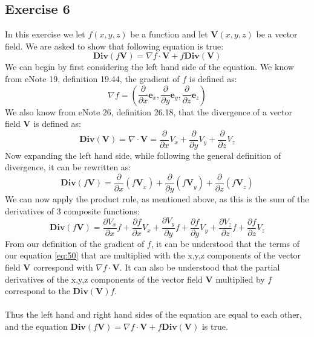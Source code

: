 \documentclass{article}
\begin{document}
\subsection{Exercise 6}
In this exercise we let $f(x,y,z)$ be a function and let $\mathbf{V}(x,y,z)$ be a vector field. We are asked to show that following equation is true:
\begin{equation}
    \mathbf{Div}(f\mathbf{V})= \nabla f\cdot \mathbf{V}+\mathit{f \mathbf{Div}}\left(\mathbf{V}\right)
\end{equation}
We can begin by first considering the left hand side of the equation. We know from eNote 19, definition 19.44, the gradient of $f$ is defined as:
\begin{equation}
    \nabla f=(\frac{\partial }{\partial x}\mathbf{e}_{x},\frac{\partial}{\partial y}\mathbf{e}_{y},\frac{\partial}{\partial z}\mathbf{e}_{z})
\end{equation}
We also know from eNote 26, definition 26.18, that the divergence of a vector field $\mathbf{V}$ is defined as:
\begin{equation}
    \mathbf{Div}\left(\mathbf{V}\right)=\nabla \cdot \mathbf{V}=\frac{\partial}{\partial x}{V}_{x}+\frac{\partial}{\partial y}{V}_{y}+\frac{\partial}{\partial z}{V}_{z}
\end{equation}
Now expanding the left hand side, while following the general definition of divergence, it can be rewritten as:
\begin{equation}
    \mathbf{Div}\left(\mathit{f\mathbf{V}}\right)=\frac{\partial}{\partial x}\left(\mathit{f\mathbf{V}}_{x}\right)+\frac{\partial}{\partial y}\left(\mathit{f\mathbf{V}}_{y}\right)+\frac{\partial}{\partial z} \left(\mathit{f\mathbf{V}}_{z}\right)
\end{equation}
We can now apply the product rule, as mentioned above, as this is the sum of the derivatives of 3 composite functions:
\begin{equation} \label{eq:50}
    \mathbf{Div}\left(\mathit{f\mathbf{V}}\right)=\frac{\partial V_x}{\partial x}f+\frac{\partial f}{\partial x}V_{x}+\frac{\partial V_y}{\partial y}f+\frac{\partial f}{\partial y}V_{y}+\frac{\partial V_z}{\partial z}f+\frac{\partial f}{\partial z}V_{z}
\end{equation}
From our definition of the gradient of $f$, it can be understood that the terms of our equation \ref{eq:50} that are multiplied with the x,y,z components of the vector field $\mathbf{V}$ correspond with $\nabla f \cdot \mathbf{V}$. It can also be understood that the partial derivatives of the x,y,z components of the vector field $\mathbf{V}$ multiplied by $f$ correspond to the $\mathbf{Div}(\mathbf{V})f$.
\\
\\
Thus the left hand and right hand sides of the equation are equal to each other, and the equation $ \mathbf{Div}(f\mathbf{V})= \nabla f\cdot \mathbf{V}+\mathit{f \mathbf{Div}}\left(\mathbf{V}\right)$ is true. 
\end{document}
